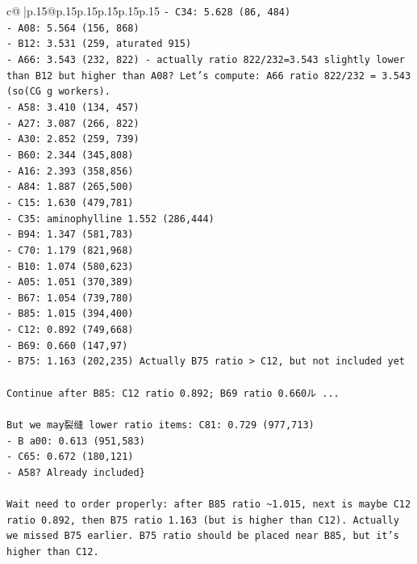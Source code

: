 \documentclass{article}
\begin{document}
{\begin{supertabular}{c@{$\;$}|p{.15\linewidth}@{}p{.15\linewidth}p{.15\linewidth}p{.15\linewidth}p{.15\linewidth}p{.15\linewidth}}
{{{\texttt{{-} C34: 5.628 (86, 484)} \\
\texttt{{-} A08: 5.564 (156, 868)} \\
\texttt{{-} B12: 3.531 (259, aturated 915)} \\
\texttt{{-} A66: 3.543 (232, 822) {-} actually ratio 822/232=3.543 slightly lower than B12 but higher than A08? Let's compute: A66 ratio 822/232 = 3.543 (so(CG g workers).} \\
\texttt{{-} A58: 3.410 (134, 457)} \\
\texttt{{-} A27: 3.087 (266, 822)} \\
\texttt{{-} A30: 2.852 (259, 739)} \\
\texttt{{-} B60: 2.344 (345,808)} \\
\texttt{{-} A16: 2.393 (358,856)} \\
\texttt{{-} A84: 1.887 (265,500)} \\
\texttt{{-} C15: 1.630 (479,781)} \\
\texttt{{-} C35: aminophylline 1.552 (286,444)} \\
\texttt{{-} B94: 1.347 (581,783)} \\
\texttt{{-} C70: 1.179 (821,968)} \\
\texttt{{-} B10: 1.074 (580,623)} \\
\texttt{{-} A05: 1.051 (370,389)} \\
\texttt{{-} B67: 1.054 (739,780)} \\
\texttt{{-} B85: 1.015 (394,400)} \\
\texttt{{-} C12: 0.892 (749,668)} \\
\texttt{{-} B69: 0.660 (147,97)} \\
\texttt{{-} B75: 1.163 (202,235) Actually B75 ratio > C12, but not included yet} \\
\\ 
\texttt{Continue after B85: C12 ratio 0.892; B69 ratio 0.660ル ...} \\
\\ 
\texttt{But we may裂缝 lower ratio items: C81: 0.729 (977,713)} \\
\texttt{{-} B a00: 0.613 (951,583)} \\
\texttt{{-} C65: 0.672 (180,121)} \\
\texttt{{-} A58? Already included\}} \\
\\ 
\texttt{Wait need to order properly: after B85 ratio \textasciitilde{}1.015, next is maybe C12 ratio 0.892, then B75 ratio 1.163 (but is higher than C12). Actually we missed B75 earlier. B75 ratio should be placed near B85, but it's higher than C12.} \\
}}}
\end{supertabular}}
\end{document}
